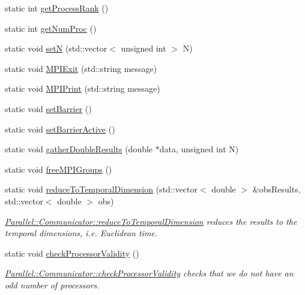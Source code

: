 \begin{DoxyCompactItemize}
\item 
static int \mbox{\hyperlink{class_parallel_1_1_communicator_a474ab433da0e83ef372d74e26a7e5cb0}{get\+Process\+Rank}} ()
\item 
static int \mbox{\hyperlink{class_parallel_1_1_communicator_a7b1f80fb49a0cc83f2031c3415174150}{get\+Num\+Proc}} ()
\item 
static void \mbox{\hyperlink{class_parallel_1_1_communicator_a1db417babab93c8d8bf6339ff2bab540}{setN}} (std\+::vector$<$ unsigned int $>$ N)
\item 
static void \mbox{\hyperlink{class_parallel_1_1_communicator_a57bb28ee8dbc4efd708a2695423778c4}{M\+P\+I\+Exit}} (std\+::string message)
\item 
static void \mbox{\hyperlink{class_parallel_1_1_communicator_a34a1d27c0e2b2b101b97a53734dbc4f8}{M\+P\+I\+Print}} (std\+::string message)
\item 
static void \mbox{\hyperlink{class_parallel_1_1_communicator_a14aa3d54f5efe28094df886948e3dee2}{set\+Barrier}} ()
\item 
static void \mbox{\hyperlink{class_parallel_1_1_communicator_af61a4b8a49509982ae96d2a99dfb9f49}{set\+Barrier\+Active}} ()
\item 
static void \mbox{\hyperlink{class_parallel_1_1_communicator_ae5739683ff54a7c39af6e37920e70ea5}{gather\+Double\+Results}} (double $\ast$data, unsigned int N)
\item 
static void \mbox{\hyperlink{class_parallel_1_1_communicator_aca0ac979aee1a649dbe5d4582b06a707}{free\+M\+P\+I\+Groups}} ()
\item 
static void \mbox{\hyperlink{class_parallel_1_1_communicator_a5d42989e7a3022de6042e3503aa35346}{reduce\+To\+Temporal\+Dimension}} (std\+::vector$<$ double $>$ \&obs\+Results, std\+::vector$<$ double $>$ obs)
\begin{DoxyCompactList}\small\item\em \mbox{\hyperlink{class_parallel_1_1_communicator_a5d42989e7a3022de6042e3503aa35346}{Parallel\+::\+Communicator\+::reduce\+To\+Temporal\+Dimension}} reduces the results to the temporal dimensions, i.\+e. Euclidean time. \end{DoxyCompactList}\item 
static void \mbox{\hyperlink{class_parallel_1_1_communicator_acd7e2f114728e5207093743a58ab3a40}{check\+Processor\+Validity}} ()
\begin{DoxyCompactList}\small\item\em \mbox{\hyperlink{class_parallel_1_1_communicator_acd7e2f114728e5207093743a58ab3a40}{Parallel\+::\+Communicator\+::check\+Processor\+Validity}} checks that we do not have an odd number of processors. \end{DoxyCompactList}\item 

\end{DoxyCompactItemize}
